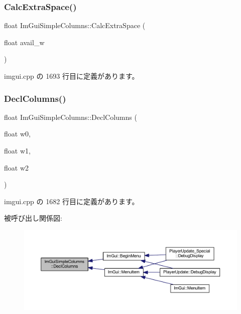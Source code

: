 \subsubsection{\texorpdfstring{Calc\+Extra\+Space()}{CalcExtraSpace()}}
{\footnotesize\ttfamily float Im\+Gui\+Simple\+Columns\+::\+Calc\+Extra\+Space (\begin{DoxyParamCaption}\item[{float}]{avail\+\_\+w }\end{DoxyParamCaption})}



 imgui.\+cpp の 1693 行目に定義があります。

\mbox{\label{struct_im_gui_simple_columns_a2daac4e4973ea1e9f2dda655206796fc}} 
\subsubsection{\texorpdfstring{Decl\+Columns()}{DeclColumns()}}
{\footnotesize\ttfamily float Im\+Gui\+Simple\+Columns\+::\+Decl\+Columns (\begin{DoxyParamCaption}\item[{float}]{w0,  }\item[{float}]{w1,  }\item[{float}]{w2 }\end{DoxyParamCaption})}



 imgui.\+cpp の 1682 行目に定義があります。

被呼び出し関係図\+:\nopagebreak
\begin{figure}[H]
\begin{center}
\leavevmode
\includegraphics[width=350pt]{struct_im_gui_simple_columns_a2daac4e4973ea1e9f2dda655206796fc_icgraph}
\end{center}
\end{figure}
\mbox{\label{struct_im_gui_simple_columns_a189662e328df2bf6947d9ab292f8ed21}} 

